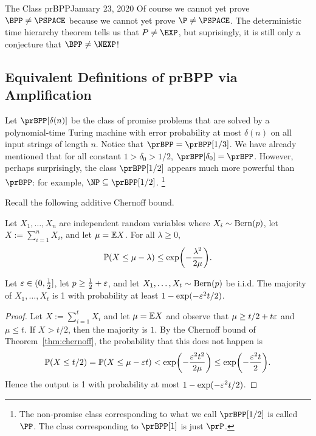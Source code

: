 \begin{lecture}{1}{The Class prBPP}{January 23, 2020}
Of course we cannot yet prove $\BPP \ne \PSPACE$ because we cannot yet prove
$\P \ne \PSPACE$. The deterministic time hierarchy theorem tells us that $P \ne
\EXP$, but suprisingly, it is still only a conjecture that $\BPP \ne \NEXP$!

\subsection{Equivalent Definitions of prBPP via Amplification}

Let $\prBPP[\delta(n)]$ be the class of promise problems that are solved by a
polynomial-time Turing machine with error probability at most $\delta(n)$ on
all input strings of length $n$. Notice that $\prBPP = \prBPP[1/3]$. We have
already mentioned that for all constant $1> \delta_0 > 1/2$, $\prBPP[\delta_0] =
\prBPP$. However, perhaps surprisingly, the class $\prBPP[1/2]$ appears much
more powerful than $\prBPP$: for example, $\NP \subseteq \prBPP[1/2]$.%
\footnote{The non-promise class corresponding to what we call $\prBPP[1/2]$ is
called $\PP$. The class corresponding to $\prBPP[1]$ is just $\prP$.}

Recall the following additive Chernoff bound.

\begin{theorem}\label{thm:chernoff}
  Let $X_1, \dots, X_n$ are independent random variables where $X_i \sim
  \operatorname{Bern}(p)$, let $X := \sum_{i=1}^n X_i$, and let $\mu = \mathbb{E} X$. For all
  $\lambda \ge 0$, \[
    \Pr\paren*{X \le \mu - \lambda} \le \exp\paren*{-\frac{\lambda^2}{2\mu}}.
  \]
\end{theorem}

\begin{proposition}\label{prop:maj}
  Let $\varepsilon \in (0, \frac{1}{2}]$, let $p \ge \frac{1}{2} + \varepsilon$, and let $X_1,
  \dots, X_t \sim \operatorname{Bern}(p)$ be i.i.d. The majority of $X_1, \dots, X_t$ is 1
  with probability at least $1 - \exp(-\varepsilon^2 t/2)$.
\end{proposition}

\begin{proof}
  Let $X := \sum_{i=1}^t X_i$ and let $\mu = \mathbb{E} X$ and observe that $\mu \ge
  t/2 + t\varepsilon$ and $\mu \le t$. If $X > t/2$, then the majority is $1$. By the
  Chernoff bound of Theorem~\ref{thm:chernoff}, the probability that this does
  not happen is \[
    \Pr(X \le t/2) = \Pr(X \le \mu - \eps t) < \exp\paren*{-\frac{\eps^2t^2}{2\mu}} \le \exp\paren*{-\frac{\eps^2t}{2}}.
  \]
  Hence the output is 1 with probability at most $1 - \exp(-\varepsilon^2 t/2)$.
\end{proof}


\end{lecture}

